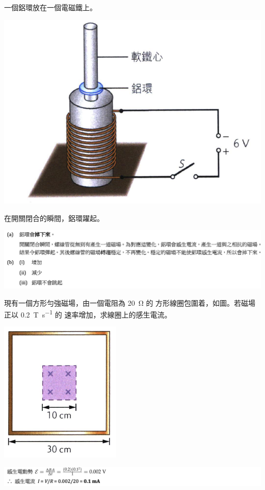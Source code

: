 {
    一個鋁環放在一個電磁鐵上。
    \par{\par\centering\includegraphics[width=.3\textwidth]{./img/ch5_induction_lq_2024-06-24-17-32-08.png}\par}
    在開關閉合的瞬間，鋁環躍起。
}{\par{\par\centering\includegraphics[width=\textwidth]{./img/ch5_induction_lq_2024-06-24-17-38-04.png}\par}}

{
    現有一個方形勻強磁場，由一個電阻為  \qty{20}{\ohm} 的 方形線圈包圍着，如圖。若磁場正以  \qty{0.2}{T.s^{-1}} 的 速率增加，求線圈上的感生電流。
    \par{\par\centering\includegraphics[width=.25\textwidth]{./img/ch5_induction_lq_2024-06-24-17-09-02.png}\par}
}{\par{\par\centering\includegraphics[width=\textwidth]{./img/ch5_induction_lq_2024-06-24-17-39-15.png}\par}}

